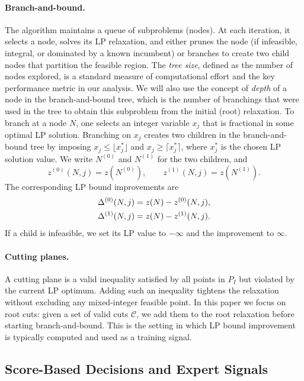 \documentclass[smallextended,envcountsect]{svjour3} %
\newcommand{\Ccal}{\mathcal{C}}
\newcommand{\0}{\mathbf{0}}
\newcommand{\1}{\mathbf{1}} %
\begin{document}
\paragraph{Branch-and-bound.}
The algorithm maintains a queue of subproblems (nodes).
At each iteration, it selects a node, solves its LP relaxation, and either prunes the node (if infeasible, integral, or dominated by a known incumbent) or branches to create two child nodes that partition the feasible region.
The \emph{tree size}, defined as the number of nodes explored, is a standard measure of computational effort and the key performance metric in our analysis. We will also use the concept of {\em depth} of a node in the branch-and-bound tree, which is the number of branchings that were used in the tree to obtain this subproblem from the initial (root) relaxation.
To branch at a node $N$, one selects an integer variable $x_j$ that is fractional in some optimal LP solution.
Branching on $x_j$ creates two children in the branch-and-bound tree by imposing $x_j \le \lfloor x_j^* \rfloor$ and $x_j \ge \lceil x_j^* \rceil$,
where $x_j^*$ is the chosen LP solution value.
We write $N^{(0)}$ and $N^{(1)}$ for the two children, and
\[
  z^{(0)}(N,j)=z(N^{(0)}),\qquad z^{(1)}(N,j)=z(N^{(1)}).
\]
The corresponding LP bound improvements are
\begin{align}\label{eq:sb_improvements_prelim}
  \Delta^{(0)}(N, j) &= z(N)-z^{(0)}(N,j),\notag\\
  \Delta^{(1)}(N, j) &= z(N)-z^{(1)}(N,j).
\end{align}
If a child is infeasible, we set its LP value to $-\infty$ and the improvement to $\infty$.

\paragraph{Cutting planes.}
A cutting plane is a valid inequality satisfied by all points in $P_I$ but violated by the current LP optimum.
Adding such an inequality tightens the relaxation without excluding any mixed-integer feasible point.
In this paper we focus on root cuts: given a set of valid cuts $\Ccal$, we add them to the root relaxation before starting branch-and-bound.
This is the setting in which LP bound improvement is typically computed and used as a training signal.

\subsection{Score-Based Decisions and Expert Signals}\label{sec:experts}
\end{document}
